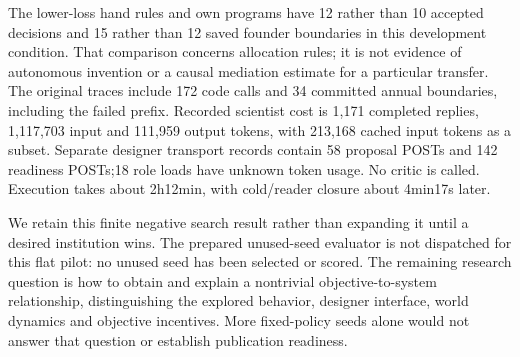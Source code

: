 The lower-loss hand rules and own programs have 12 rather than 10 accepted
decisions and 15 rather than 12 saved founder boundaries in this development
condition. That comparison concerns allocation rules; it is not evidence of
autonomous invention or a causal mediation estimate for a particular transfer.
The original traces include 172 code calls and 34 committed annual boundaries,
including the failed prefix. Recorded scientist cost is 1,171 completed replies,
1,117,703 input and 111,959 output tokens, with 213,168 cached input tokens as a
subset. Separate designer transport records contain 58 proposal POSTs and 142
readiness POSTs;18 role loads have unknown token usage. No critic is called.
Execution takes about 2h12min, with cold/reader closure about 4min17s later.

We retain this finite negative search result rather than expanding it until
a desired institution wins. The prepared unused-seed evaluator is not
dispatched for this flat pilot: no unused seed has been selected or scored.
The remaining research question is how to obtain and explain a nontrivial
objective-to-system relationship, distinguishing the explored behavior,
designer interface, world dynamics and objective incentives. More fixed-policy
seeds alone would not answer that question or establish publication readiness.
\FloatBarrier
